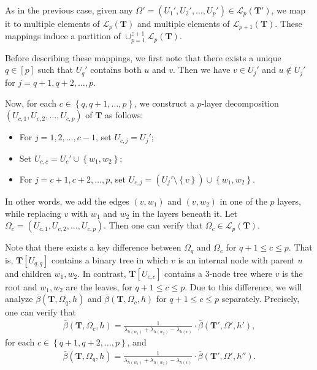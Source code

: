 \documentclass[superscriptaddress,onecolumn,nofootinbib,longbibliography,a4paper,accepted=2026-09-29]{quantumarticle}
\theoremstyle{plain}
\theoremstyle{definition}
\numberwithin{thm}{section}
\numberwithin{assumption}{section}
\numberwithin{lemma}{section}
\numberwithin{prop}{section}
\numberwithin{cor}{section}
\numberwithin{definition}{section}
\numberwithin{rmk}{section}
\numberwithin{equation}{section}
\newcommand{\lrcb}[1]{\left \{ #1 \right \}}
\newcommand{\mbf}{\mathbf{T}}
\begin{document}
\begin{itemize}
As in the previous case, given any $\Omega'=(U_1', U_2', \dots, U_p') \in \mathcal{L}_{p}(\mbf')$, we map it to multiple elements of $\mathcal{L}_p(\mbf)$ and multiple  elements of $\mathcal{L}_{p+1}(\mbf)$. These mappings induce a partition of $\cup_{p=1}^{z+1} \mathcal{L}_{p}(\mbf)$. 

Before describing these mappings, we first note that there exists a unique $q \in [p]$ such that $U_q'$ contains both $u$ and $v$. Then we have $v \in U_j'$ and $u \not \in U_j'$ for $j=q+1,q+2,\dots,p$.

Now, for each $c \in \lrcb{q, q+1,\dots,p}$, we construct a $p$-layer decomposition $(U_{c,1}, U_{c,2}, \dots, U_{c,p})$ of $\mbf$ as follows:
\begin{itemize}
    \item For $j=1,2,\dots,c-1$, set $U_{c,j}=U_j'$;        
    \item Set $U_{c,c}=U_c' \cup \lrcb{w_1, w_2}$;    
    \item For $j=c+1,c+2,\dots,p$, set $U_{c,j}=(U_j' \setminus \lrcb{v}) \cup \lrcb{w_1, w_2}$.
\end{itemize}
In other words, we add the edges $(v, w_1)$ and $(v, w_2)$ in one of the $p$ layers, while replacing $v$ with $w_1$ and $w_2$ in the layers beneath it. Let $\Omega_c = (U_{c,1}, U_{c,2}, \dots, U_{c,p})$. Then one can verify that $\Omega_c  \in \mathcal{L}_p(\mbf)$.

Note that there exists a key difference between $\Omega_q$ and $\Omega_{c}$ for $q+1 \le c \le p$. That is, $\mbf[U_{q,q}]$ contains a binary tree in which $v$ is an internal node with parent $u$ and children $w_1, w_2$. In contrast, $\mbf[U_{c,c}]$ contains a $3$-node tree where $v$ is the root and $w_1, w_2$ are the leaves, for $q+1 \le c \le p$. Due to this difference, we will analyze $\bar{\beta}(\mbf, \Omega_q, h)$ and $\bar{\beta}(\mbf, \Omega_c, h)$ for $q+1\le c\le p$ separately. Precisely, one can verify that
\begin{align}
\bar{\beta}(\mbf, \Omega_c, h)
=\frac{1}{\lambda_{h(w_1)}+\lambda_{h(w_2)}-\lambda_{h(v)}} \cdot
\bar{\beta}(\mbf', \Omega', h'),
\label{eq:induction_relation3}
\end{align}
for each $c \in \lrcb{q+1,q+2,\dots,p}$, and
\begin{align}
\bar{\beta}(\mbf, \Omega_q, h)
=\frac{1}{\lambda_{h(w_1)}+\lambda_{h(w_2)}-\lambda_{h(v)}} \cdot
\bar{\beta}(\mbf', \Omega', h'').
\label{eq:induction_relation4}
\end{align}


\end{itemize}
\end{document}
